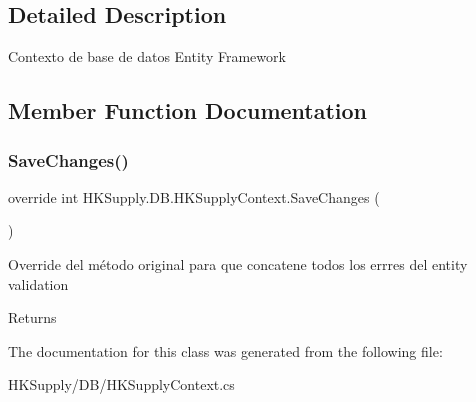 \subsection{Detailed Description}
Contexto de base de datos Entity Framework 



\subsection{Member Function Documentation}
\mbox{\label{class_h_k_supply_1_1_d_b_1_1_h_k_supply_context_a2a1188ce8fd98551e036cb87ae342132}} 
\subsubsection{\texorpdfstring{Save\+Changes()}{SaveChanges()}}
{\footnotesize\ttfamily override int H\+K\+Supply.\+D\+B.\+H\+K\+Supply\+Context.\+Save\+Changes (\begin{DoxyParamCaption}{ }\end{DoxyParamCaption})}



Override del método original para que concatene todos los errres del entity validation 

\begin{DoxyReturn}{Returns}

\end{DoxyReturn}


The documentation for this class was generated from the following file\+:\begin{DoxyCompactItemize}
\item 
H\+K\+Supply/\+D\+B/H\+K\+Supply\+Context.\+cs\end{DoxyCompactItemize}
